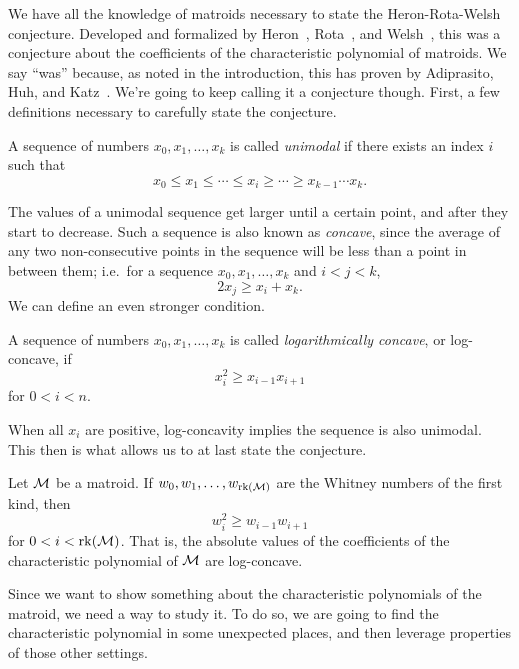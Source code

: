 \documentclass[12pt,oneside]{../../sfsuthesis}
\begin{document}
We have all the knowledge of matroids necessary to state the Heron-Rota-Welsh conjecture.
Developed and formalized by Heron~\cite{heronMatroidPolynomials1972}, Rota~\cite{rotaCombinatorialTheoryOld1970}, and Welsh~\cite{welshMatroidTheory1976}, this was a conjecture about the coefficients of the characteristic polynomial of matroids.
We say ``was'' because, as noted in the introduction, this has proven by Adiprasito, Huh, and Katz~\cite{adiprasitoHodgeTheoryCombinatorial2018}.
We're going to keep calling it a conjecture though.
First, a few definitions necessary to carefully state the conjecture.

\begin{definition}[Unimodal]\th\label{def:unimodal}
    A sequence of numbers \( x_0, x_1, \dots, x_k \) is called \emph{unimodal} if there exists an index \( i \) such that
    \[
        x_0 \leq x_1 \leq \cdots \leq x_i \geq \cdots \geq x_{k-1} \cdots x_k.
    \]

\end{definition}

The values of a unimodal sequence get larger until a certain point, and after they start to decrease.
Such a sequence is also known as \emph{concave}, since the average of any two non-consecutive points in the sequence will be less than a point in between them;
i.e.\ for a sequence \( x_0, x_1, \dots, x_k \) and \( i < j < k \),
\[
    2x_j \geq x_i + x_k.
\]
We can define an even stronger condition.

\begin{definition}\th\label{def:logConcave}
    A sequence of numbers \( x_0, x_1, \dots, x_k \) is called \emph{logarithmically concave}, or log-concave, if
    \[
        x_i^2 \geq x_{i-1} x_{i+1}
    \]
    for \( 0 < i < n \).
\end{definition}

When all \( x_i \) are positive, log-concavity implies the sequence is also unimodal.
This then is what allows us to at last state the conjecture.

\begin{theorem}\th\label{thm:HRW}
    Let \( \mathcal{M} \) be a matroid.
    If \( w_0, w_1, \dots, w_{\operatorname{rk}(\mathcal{M})} \) are the Whitney numbers of the first kind, then
    \[
        w_i^2 \geq w_{i-1}w_{i+1}
    \]
    for \( 0 < i < \operatorname{rk}(\mathcal{M}) \).
    That is, the absolute values of the coefficients of the characteristic polynomial of \( \mathcal{M} \) are log-concave.
\end{theorem}

Since we want to show something about the characteristic polynomials of the matroid, we need a way to study it.
To do so, we are going to find the characteristic polynomial in some unexpected places, and then leverage properties of those other settings.
\end{document}
